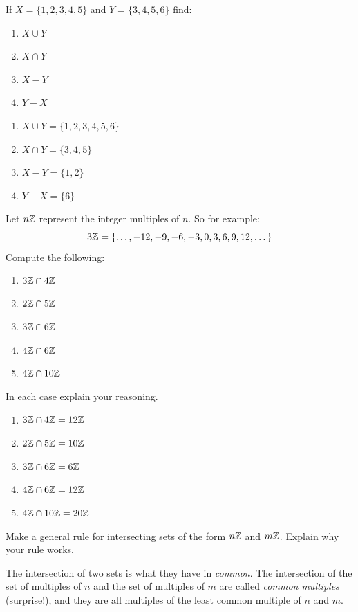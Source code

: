 \documentclass[nooutcomes]{ximera}
\begin{document}
\begin{problem}
If $X = \{1,2,3,4,5\}$ and $Y = \{3,4,5,6\}$ find:
\begin{enumerate}
\item $X\cup Y$
\item $X\cap Y$
\item $X-Y$
\item $Y-X$
\end{enumerate}
\begin{freeResponse}
\begin{hint}
\begin{enumerate}
\item $X\cup Y = \{1,2,3,4,5,6\}$
\item $X\cap Y = \{3,4,5\}$
\item $X-Y = \{1,2\}$
\item $Y-X = \{6\}$
\end{enumerate}
\end{hint}
\end{freeResponse}
\end{problem}

\begin{problem}
Let $n\mathbb Z$ represent the integer multiples of $n$. So for example:
\[
3\mathbb Z = \{\dots,-12,-9,-6,-3,0,3,6,9,12,\dots\}
\]
Compute the following:
\begin{enumerate}
\item $3\mathbb Z\cap 4\mathbb Z$
\item $2\mathbb Z\cap 5\mathbb Z$
\item $3\mathbb Z\cap 6\mathbb Z$
\item $4\mathbb Z\cap 6\mathbb Z$
\item $4\mathbb Z\cap 10\mathbb Z$
\end{enumerate}
In each case explain your reasoning. 
\begin{freeResponse}
\begin{hint}
\begin{enumerate}
\item $3\mathbb Z\cap 4\mathbb Z = 12\mathbb Z$
\item $2\mathbb Z\cap 5\mathbb Z = 10\mathbb Z$
\item $3\mathbb Z\cap 6\mathbb Z = 6\mathbb Z$
\item $4\mathbb Z\cap 6\mathbb Z = 12\mathbb Z$
\item $4\mathbb Z\cap 10\mathbb Z = 20\mathbb Z$
\end{enumerate}
\end{hint}
\end{freeResponse}
\end{problem}

\begin{problem}
Make a general rule for intersecting sets of the form $n\mathbb Z$ and
  $m\mathbb Z$. Explain why your rule works.
\begin{freeResponse}
\begin{hint}
The intersection of two sets is what they have in \emph{common}.  The intersection of the set of multiples of $n$ and the set of multiples of $m$ are called \emph{common multiples} (surprise!), and they are all multiples of the least common multiple of $n$ and $m$.  
\end{hint}
\end{freeResponse}
\end{problem}
\end{document}
